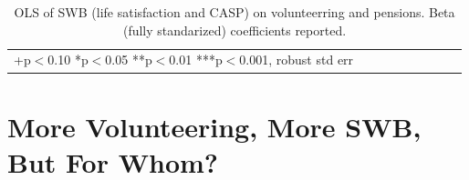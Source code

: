 \documentclass[10pt, letterpaper]{article}
\begin{document}
\begin{spacing}{1.4}



\begin{spacing}{.9}
\begin{table}[H]\centering \caption{OLS of SWB  (life satisfaction and CASP) on
    volunteerring and pensions. Beta (fully standarized) coefficients reported.}  \begin{scriptsize} \begin{tabular}{p{1.8in}p{.5in}p{.5in}p{.5in}p{.5in}|p{.5in}p{.5in}p{.5in}p{.5in}p{.5in}p{.4in}p{.5in}p{.4in}}\hline 
      \hline\multicolumn{5}{l}{+p$<$0.10 *p$<$0.05 **p$<$0.01 ***p$<$0.001,
        robust std err} \end{tabular}\label{regCw6w4} \end{scriptsize}\end{table}
\end{spacing}




\section{More Volunteering, More SWB, But For Whom?}


\end{spacing}
\end{document}

